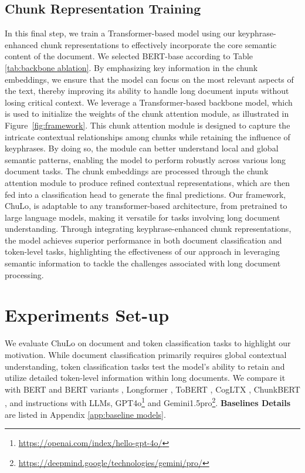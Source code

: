 \documentclass[11pt]{article}
\begin{document}
\subsection{Chunk Representation Training}
In this final step, we train a Transformer-based model using our keyphrase-enhanced chunk representations to effectively incorporate the core semantic content of the document. We selected BERT-base according to Table \ref{tab:backbone ablation}. By emphasizing key information in the chunk embeddings, we ensure that the model can focus on the most relevant aspects of the text, thereby improving its ability to handle long document inputs without losing critical context.
We leverage a Transformer-based backbone model, which is used to initialize the weights of the chunk attention module, as illustrated in Figure~\ref{fig:framework}. This chunk attention module is designed to capture the intricate contextual relationships among chunks while retaining the influence of keyphrases. By doing so, the module can better understand local and global semantic patterns, enabling the model to perform robustly across various long document tasks. The chunk embeddings are processed through the chunk attention module to produce refined contextual representations, which are then fed into a classification head to generate the final predictions.
Our framework, ChuLo, is adaptable to any transformer-based architecture, from pretrained to large language models, making it versatile for tasks involving long document understanding. Through integrating keyphrase-enhanced chunk representations, the model achieves superior performance in both document classification and token-level tasks, highlighting the effectiveness of our approach in leveraging semantic information to tackle the challenges associated with long document processing.

\section{Experiments Set-up}
We evaluate ChuLo on document and token classification tasks to highlight our motivation. While document classification primarily requires global contextual understanding, token classification tasks test the model's ability to retain and utilize detailed token-level information within long documents. We compare it with BERT \citep{kenton2019bert} and BERT variants \citep{park2022efficient}, Longformer \citep{beltagy2020longformer}, ToBERT \citep{pappagari2019hierarchical}, CogLTX \citep{ding2020cogltx}, ChunkBERT \citep{jaiswal2023breaking}, and instructions with LLMs, GPT4o\footnote{\url{https://openai.com/index/hello-gpt-4o/}} and Gemini1.5pro\footnote{\url{https://deepmind.google/technologies/gemini/pro/}}. \textbf{Baselines Details} are listed in Appendix \ref{app:baseline models}.
\end{document}
